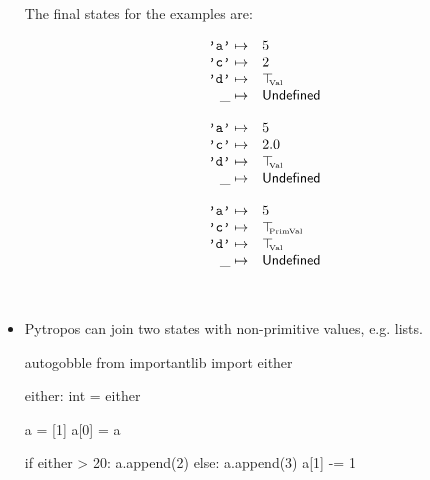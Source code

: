 \begin{itemize}
  The final states for the examples are:

\begin{minipage}{.25\textwidth}
  \[\begin{array}{rl}
      \texttt{'a'} \mapsto& 5 \\
      \texttt{'c'} \mapsto& 2 \\
      \texttt{'d'} \mapsto& \top_{\hspace{-1mm}{\text{\tiny{Val}}}} \\
      \_ \mapsto& \mathsf{Undefined} \\
  \end{array}\]
\end{minipage}\hfill%
\begin{minipage}{.25\textwidth}
  \[\begin{array}{rl}
      \texttt{'a'} \mapsto& 5 \\
      \texttt{'c'} \mapsto& 2.0 \\
      \texttt{'d'} \mapsto& \top_{\hspace{-1mm}{\text{\tiny{Val}}}} \\
      \_ \mapsto& \mathsf{Undefined} \\
  \end{array}\]
\end{minipage}\hfill%
\begin{minipage}{.25\textwidth}
  \[\begin{array}{rl}
      \texttt{'a'} \mapsto& 5 \\
      \texttt{'c'} \mapsto& \top_{\hspace{-1mm}{\text{\tiny{PrimVal}}}} \\
      \texttt{'d'} \mapsto& \top_{\hspace{-1mm}{\text{\tiny{Val}}}} \\
      \_ \mapsto& \mathsf{Undefined} \\
  \end{array}\]
\end{minipage}\\[.4em]


\item Pytropos can join two states with non-primitive values, e.g. lists.

  \begin{pythoncode*}{autogobble}
    from importantlib import either

    either: int = either

    a = [1]
    a[0] = a

    if either > 20:
      a.append(2)
    else:
      a.append(3)
      a[1] -= 1
  \end{pythoncode*}


\end{itemize}
